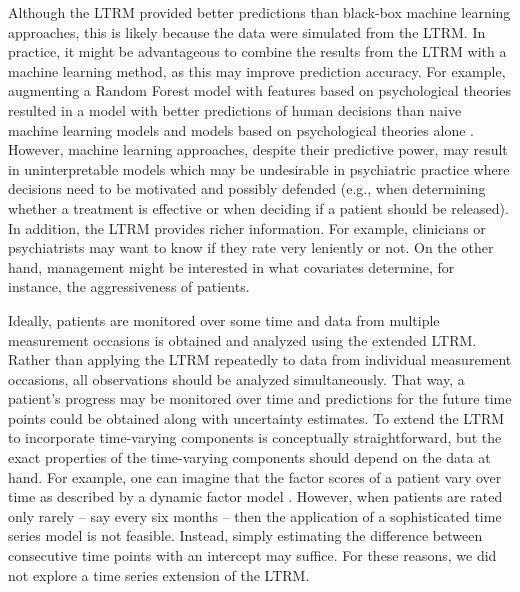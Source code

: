 \documentclass[a4paper,usenames,dvipsnames]{article}
\newenvironment{revision}{\color{teal}}{\color{black}}
\begin{document}
Although the LTRM provided better predictions than black-box machine learning approaches, this is likely because the data were simulated from the LTRM. 
\begin{revision}%
In practice, it might be advantageous to combine the results from the LTRM with a machine learning method, as this may improve prediction accuracy. 
For example, augmenting a Random Forest model with features based on psychological theories resulted in a model with better predictions of human decisions than naive machine learning models and models based on psychological theories alone \cite{plonsky2019predicting, plonsky2017psychological}.%
\end{revision}
However, machine learning approaches, despite their predictive power, may result in uninterpretable models which may be undesirable in psychiatric practice where decisions need to be motivated and possibly defended (e.g., when determining whether a treatment is effective or when deciding if a patient should be released). \begin{revision}In addition, the LTRM provides richer information. For example, clinicians or psychiatrists may want to know if they rate very leniently or not. On the other hand, management might be interested in what covariates determine, for instance, the aggressiveness of patients.\end{revision}

Ideally, patients are monitored over some time and data from multiple measurement occasions is obtained and analyzed using the extended LTRM. Rather than applying the LTRM repeatedly to data from individual measurement occasions, all observations should be analyzed simultaneously. That way, a patient's progress may be monitored over time and predictions for the future time points could be obtained along with uncertainty estimates. To extend the LTRM to incorporate time-varying components is conceptually straightforward, but the exact properties of the time-varying components should depend on the data at hand. For example, one can imagine that the factor scores of a patient vary over time as described by a dynamic factor model \cite{molenaar1985dynamic, forni2000generalized}. However, when patients are rated only rarely -- say every six months -- then the application of a sophisticated time series model is not feasible. Instead, simply estimating the difference between consecutive time points with an intercept may suffice. For these reasons, we did not explore a time series extension of the LTRM.
\end{document}
